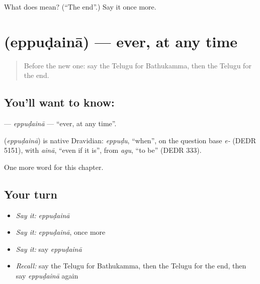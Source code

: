 \begin{tcolorbox}[breakable,colback=teal!4,colframe=teal!35!black,title={Before you move on}]
What does  mean? (\textquotedblleft{}The end\textquotedblright{}.) Say it once more.
\end{tcolorbox}
\section[\texorpdfstring{\te{ఎప్పుడైనా} (eppuḍainā)}{ఎప్పుడైనా (eppuḍainā)}]{ (eppuḍainā) — ever, at any time}

\label{lesson:TE-C253-eppudaina}



\begin{quote}
Before the new one: say the Telugu for Bathukamma, then the Telugu for the end.
\end{quote}

\subsection*{You'll want to know: }
\textbf{} — \emph{eppuḍainā} — \textquotedblleft{}ever, at any time\textquotedblright{}.

\begin{cousinweb}
\textbf{} (\emph{eppuḍainā}) is native Dravidian: \emph{eppuḍu}, \textquotedblleft{}when\textquotedblright{}, on the question base \emph{e-} (DEDR 5151), with \emph{ainā}, \textquotedblleft{}even if it is\textquotedblright{}, from \emph{agu}, \textquotedblleft{}to be\textquotedblright{} (DEDR 333).
\end{cousinweb}

\begin{grammarlens}[title={What you've built}]
One more word for this chapter.
\end{grammarlens}

\subsection*{Your turn}
\begin{itemize}
\raggedright
  \item \emph{Say it:} \emph{eppuḍainā}
  \item \emph{Say it:} \emph{eppuḍainā}, once more
  \item \emph{Say it:} say \emph{eppuḍainā}
  \item \emph{Recall:} say the Telugu for Bathukamma, then the Telugu for the end, then say \emph{eppuḍainā} again
\end{itemize}

